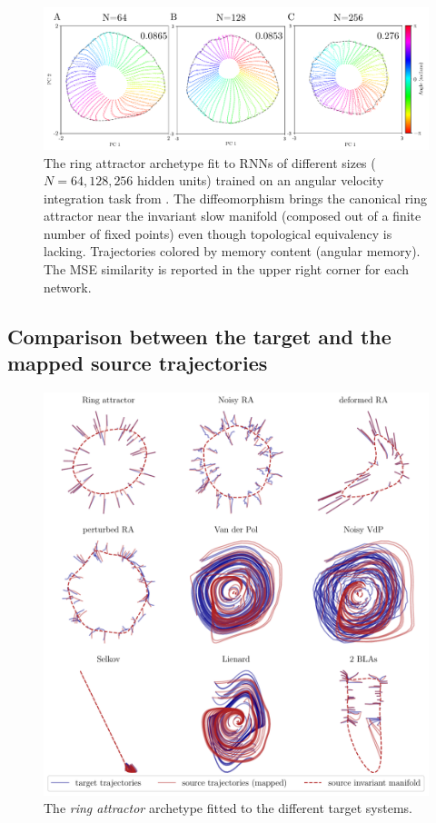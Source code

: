 \documentclass{article}
\theoremstyle{definition} \newtheorem{definition}{Definition}  \newtheorem{example}{Example}
\theoremstyle{remark} \newtheorem{remark}{Remark}
\newcounter{ct}
\begin{document}
\begin{figure}[htbp]
    \centering
    \includegraphics[width=0.95\linewidth]{avi_rnn_recttanh}
    \caption{The ring attractor archetype fit to RNNs of different sizes ($N=64,128,256$ hidden units) trained on an angular velocity integration task from \citet{Sagodi2024a}.
    The diffeomorphism brings the canonical ring attractor near the invariant slow manifold (composed out of a finite number of fixed points) even though topological equivalency is lacking.
    Trajectories colored by memory content (angular memory).
    The MSE similarity is reported in the upper right corner for each network.
    }
    \label{fig:avi_rnn_recttanh}
\end{figure}

	
\clearpage  
\subsection{Comparison between the target and the mapped source trajectories}\label{sec:comparison_ts}
\begin{figure}[htbp]
    \centering
    \includegraphics[width=0.95\linewidth]{ring_traj_invman}
    \caption{The \emph{ring attractor} archetype fitted to the different target systems.
    }
    \label{fig:ring_traj_invman}
\end{figure}
\end{document}
